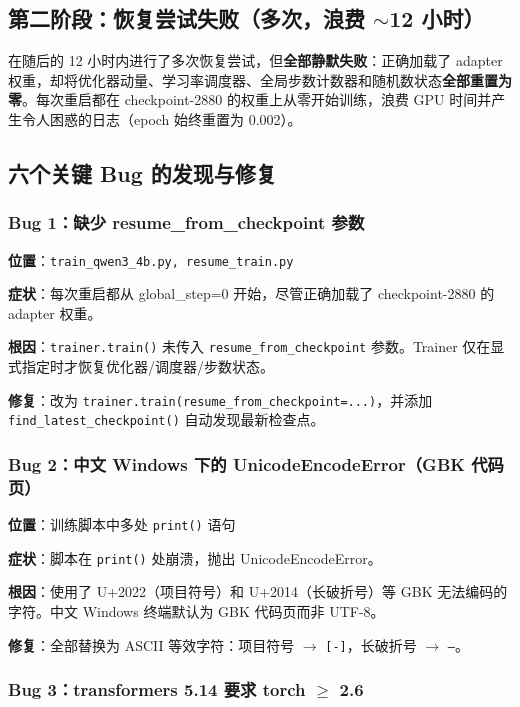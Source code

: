 \documentclass[12pt,a4paper]{ctexart}
\begin{document}
\subsection{第二阶段：恢复尝试失败（多次，浪费 $\sim$12 小时）}

在随后的 12 小时内进行了多次恢复尝试，但\textbf{全部静默失败}：正确加载了 adapter 权重，却将优化器动量、学习率调度器、全局步数计数器和随机数状态\textbf{全部重置为零}。每次重启都在 checkpoint-2880 的权重上从零开始训练，浪费 GPU 时间并产生令人困惑的日志（epoch 始终重置为 0.002）。

\subsection{六个关键 Bug 的发现与修复}

\subsubsection*{Bug 1：缺少 resume\_from\_checkpoint 参数}

\textbf{位置}：\texttt{train\_qwen3\_4b.py, resume\_train.py}

\textbf{症状}：每次重启都从 global\_step=0 开始，尽管正确加载了 checkpoint-2880 的 adapter 权重。

\textbf{根因}：\texttt{trainer.train()} 未传入 \texttt{resume\_from\_checkpoint} 参数。Trainer 仅在显式指定时才恢复优化器/调度器/步数状态。

\textbf{修复}：改为 \texttt{trainer.train(resume\_from\_checkpoint=...)}，并添加 \texttt{find\_latest\_checkpoint()} 自动发现最新检查点。

\subsubsection*{Bug 2：中文 Windows 下的 UnicodeEncodeError（GBK 代码页）}

\textbf{位置}：训练脚本中多处 \texttt{print()} 语句

\textbf{症状}：脚本在 \texttt{print()} 处崩溃，抛出 UnicodeEncodeError。

\textbf{根因}：使用了 U+2022（项目符号）和 U+2014（长破折号）等 GBK 无法编码的字符。中文 Windows 终端默认为 GBK 代码页而非 UTF-8。

\textbf{修复}：全部替换为 ASCII 等效字符：项目符号 $\to$ \texttt{[-]}，长破折号 $\to$ \texttt{--}。

\subsubsection*{Bug 3：transformers 5.14 要求 torch $\ge$ 2.6}
\end{document}
